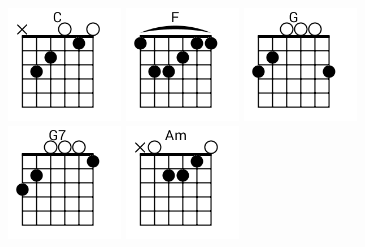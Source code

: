 \begin{figure}[h]
\centering
\includegraphics[width=3cm]{../Akordy/c.png}
\includegraphics[width=3cm]{../Akordy/f.png}
\includegraphics[width=3cm]{../Akordy/g.png}
\includegraphics[width=3cm]{../Akordy/g7.png}
\includegraphics[width=3cm]{../Akordy/am.png}
\end{figure}
